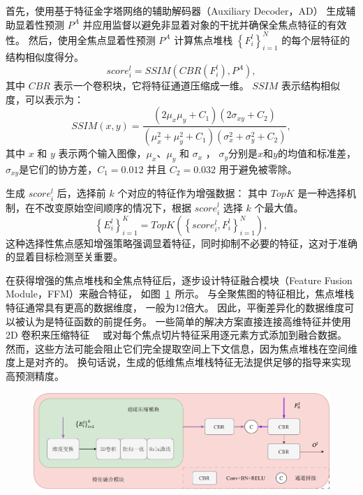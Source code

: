 首先，使用基于特征金字塔网络的辅助解码器（Auxiliary Decoder，AD）
生成辅助显着性预测 $ P^{A} $ 并应用监督以避免非显着对象的干扰并确保全焦点特征的有效性。 
然后，使用全焦点显着性预测 $ P^{A} $ 计算焦点堆栈 $ \left \{ F_{i}^{l} \right \}_{i=1}^{N} $ 的每个层特征的结构相似度得分。 
\begin{equation}
	score_{i}^{l} = SSIM \left ( CBR \left ( F_{i}^{l} \right ), P^{A} \right ),
\end{equation}
%
%
其中 $CBR$ 表示一个卷积块，它将特征通道压缩成一维。 $SSIM$ 表示结构相似度，可以表示为： 
%
%
\begin{equation} 	
	SSIM(x,y)=\frac{\left ( 2\mu_{x}\mu_{y}+C_{1} \right ) \left (  2\sigma_{xy}+C_{2} \right )  } 	
	{\left ( \mu_{x}^{2} + \mu_{y}^{2}+C_{1}\right ) \left ( \sigma_{x}^{2}+ \sigma_{y}^{2} + C_{2} \right ) } , 	
\end{equation}
其中 $x$ 和 $y$ 表示两个输入图像，$\mu_{x}$、$\mu_{y}$ 和 $\sigma_{x}$ ， $\sigma_{y}$分别是$x$和$y$的均值和标准差，$\sigma_{xy}$是它们的协方差，$C_{1} = 0.012$ 并且 $C_{2} = 0.032$ 用于避免被零除。 
%
%
%
%
\par
%
%
生成 $ score_{i}^{l} $ 后，选择前 $k$ 个对应的特征作为增强数据：
其中 $ TopK $ 是一种选择机制，在不改变原始空间顺序的情况下，根据 $ score_{i}^{l} $ 选择 $k$ 个最大值。 
\begin{equation}
	\left \{ E_{i}^{l} \right \}_{i=1}^{K} = TopK \left ( \left \{ score_{i}^{l}, F_{i}^{l} \right \}_{i=1}^{N} \right ), 	
\end{equation}
%
%
这种选择性焦点感知增强策略强调显着特征，同时抑制不必要的特征，这对于准确的显着目标检测至关重要。
%
%
%
%
\par
%
%
在获得增强的焦点堆栈和全焦点特征后，逐步设计特征融合模块（Feature Fusion Module，FFM）来融合特征，
如图~\ref{cpt3_fig1:ccm}~所示。
与全聚焦图的特征相比，焦点堆栈特征通常具有更高的数据维度， 一般为12倍大。 
因此，平衡差异化的数据维度可以被认为是特征函数的前提任务。
一些简单的解决方案直接连接高维特征并使用 2D 卷积来压缩特征~\cite{piao2021panet}~
或对每个焦点切片特征采用逐元素方式添加到融合数据\cite{liu2021light}。 然而，这些方法可能会阻止它们完全提取空间上下文信息，因为焦点堆栈在空间维度上是对齐的。 换句话说，生成的低维焦点堆栈特征无法提供足够的指导来实现高预测精度。 
%
%
%
%
%
\begin{figure}[!ht]
	\centering
	\includegraphics[width=0.95\linewidth]{figures/chapter3/ccm}
	\label{cpt3_fig1:ccm}
\end{figure}




